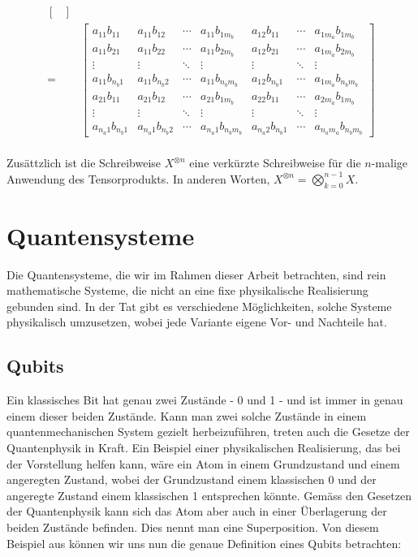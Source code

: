 \begin{align*}
\begin{bmatrix}
    \end{bmatrix} \\[0.5cm]
    =
    &\begin{bmatrix}
        a_{11}b_{11} & a_{11}b_{12} & \cdots & a_{11}b_{1m_b} & a_{12}b_{11} & \cdots & a_{1m_a}b_{1m_b} \\
        a_{11}b_{21} & a_{11}b_{22} & \cdots & a_{11}b_{2m_b} & a_{12}b_{21} & \cdots & a_{1m_a}b_{2m_b} \\
        \vdots & \vdots & \ddots & \vdots & \vdots & \ddots & \vdots \\
        a_{11}b_{n_b1} & a_{11}b_{n_b2} & \cdots & a_{11}b_{n_bm_b} & a_{12}b_{n_b1} & \cdots & a_{1m_a}b_{n_bm_b} \\ 
        a_{21}b_{11} & a_{21}b_{12} & \cdots & a_{21}b_{1m_b} & a_{22}b_{11} & \cdots & a_{2m_a}b_{1m_b} \\
        \vdots & \vdots & \ddots & \vdots & \vdots & \ddots & \vdots \\
        a_{n_a1}b_{n_b1} & a_{n_a1}b_{n_b2} & \cdots & a_{n_a1}b_{n_bm_b} & a_{n_a2}b_{n_b1} & \cdots & a_{n_am_a}b_{n_bm_b}
    \end{bmatrix}
\end{align*}

\paragraph{}
Zusättzlich ist die Schreibweise $X^{\otimes n}$ eine verkürzte Schreibweise für die $n$-malige Anwendung des Tensorprodukts. In anderen Worten, $X^{\otimes n} = \bigotimes_{k = 0}^{n - 1}X$.
\section{Quantensysteme}
Die Quantensysteme, die wir im Rahmen dieser Arbeit betrachten, sind rein mathematische Systeme, die nicht an eine fixe physikalische Realisierung gebunden sind. In der Tat gibt es verschiedene Möglichkeiten, solche Systeme physikalisch umzusetzen, wobei jede Variante eigene Vor- und Nachteile hat.

\subsection{Qubits}
Ein klassisches Bit hat genau zwei Zustände - 0 und 1 - und ist immer in genau einem dieser beiden Zustände. Kann man  zwei solche Zustände in einem quantenmechanischen System gezielt herbeizuführen, treten auch die Gesetze der Quantenphysik in Kraft. Ein Beispiel einer physikalischen Realisierung, das bei der Vorstellung helfen kann, wäre ein Atom in einem Grundzustand und einem angeregten Zustand, wobei der Grundzustand einem klassischen 0 und der angeregte Zustand einem klassischen 1 entsprechen könnte. Gemäss den Gesetzen der Quantenphysik kann sich das Atom aber auch in einer Überlagerung der beiden Zustände befinden. Dies nennt man eine Superposition. Von diesem Beispiel aus können wir uns nun die genaue Definition eines Qubits betrachten:
